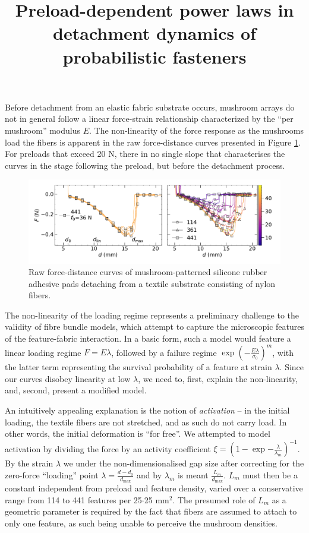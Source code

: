 \documentclass{article}
\begin{document}
\title{Preload-dependent power laws in detachment dynamics of probabilistic fasteners}
\author{}
\date{}
\maketitle

Before detachment from an elastic fabric substrate occurs, mushroom arrays do not in general
follow a linear force-strain relationship characterized by the ``per mushroom'' modulus $E$.
The non-linearity of the force response as the mushrooms load the fibers is apparent in 
the raw force-distance curves presented in Figure \ref{fig:f_d}. For preloads that exceed 20 N,
there in no single slope that characterises the curves in the stage following the preload, but
before the detachment process.

\begin{figure}
    \includegraphics[width=0.9\linewidth]{f_d.pdf}
    \caption{Raw force-distance curves of mushroom-patterned silicone rubber adhesive pads
    detaching from a textile substrate consisting of nylon fibers. \label{fig:f_d}}
\end{figure}

The non-linearity of the loading regime represents a preliminary challenge to the validity
of fibre bundle models, which attempt to capture the microscopic features of the 
feature-fabric interaction. In a basic form, such a model would feature a linear loading
regime $F=E\lambda$, followed by a failure regime $\exp{(-\frac{E\lambda}{\sigma_0})^m}$,
with the latter term representing the survival probability of a feature at strain $\lambda$.
Since our curves disobey linearity at low $\lambda$, we need to, first, explain the 
non-linearity, and, second, present a modified model.

An intuitively appealing explanation is the notion of \textit{activation} -- in the initial
loading, the textile fibers are not stretched, and as such do not carry load. In other words,
the initial deformation is ``for free''. We attempted to model activation by dividing the force
by an activity coefficient $\xi=(1-\exp{-\frac{\lambda}{\lambda_m}})^{-1}$. By the strain $\lambda$ 
we under the non-dimensionalised gap size after correcting for the zero-force ``loading'' point 
$\lambda=\frac{d-d_0}{d_\mathrm{max}}$ and by $\lambda_m$ is meant $\frac{L_m}{d_\mathrm{max}}$. $L_m$ must
then be a constant independent from preload and feature density, varied over a conservative
range from 114 to 441 features per 25$\cdot$25 mm$^2$. The presumed role of $L_m$
as a geometric parameter is required by the fact that fibers are assumed to attach 
to only one feature, as such being unable to perceive the mushroom densities. 
\end{document}
